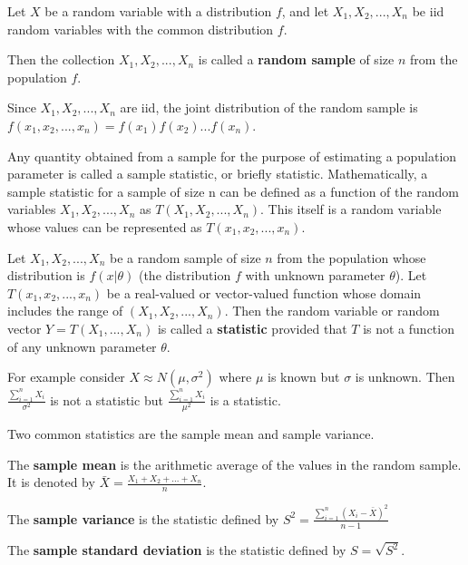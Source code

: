 \begin{defn}
Let $X$ be a random variable with a distribution $f$, and let $X_1, X_2, ..., X_n$ be iid random variables with the common distribution $f$.

Then the collection $X_1, X_2, ..., X_n$ is called a \textbf{random sample} of size $n$ from the population $f$.
\end{defn}

Since $X_1, X_2, ..., X_n$ are iid, the joint distribution of the random sample is $f(x_1, x_2, ..., x_n) = f(x_1) f(x_2) ... f(x_n)$.

Any quantity obtained from a sample for the purpose of estimating a population parameter is called a sample
statistic, or briefly statistic. Mathematically, a sample statistic for a sample of size n can be defined as a function of the random variables $X_1, X_2, ..., X_n$ as $T(X_1, X_2, ..., X_n)$. This itself is a random variable whose values can be represented as $T(x_1, x_2, ..., x_n)$.

\begin{defn}[Statistic]
    Let $X_1, X_2, ..., X_n$ be a random sample of size $n$ from the population whose distribution is $f\left (x|\theta\right )$ (the distribution $f$ with unknown parameter $\theta$). Let $T\left (x_1, x_2, ...,x_n\right )$ be a real-valued or vector-valued function whose domain includes the range of $\left (X_1, X_2, ..., X_n\right )$. Then the random variable or random vector $Y = T\left (X_1, ..., X_n\right )$ is called a \textbf{statistic} provided that $T$ is not a function of any unknown parameter $\theta$.
\end{defn}

For example consider $X \approx N(\mu, \sigma^2)$ where $\mu$ is known but $\sigma$ is unknown. Then $\frac{\sum_{i=1}^n X_i}{\sigma^2}$ is not a statistic but $\frac{\sum_{i=1}^n X_i}{\mu^2}$ is a statistic.

Two common statistics are the sample mean and sample variance.

\begin{defn}
    The \textbf{sample mean} is the arithmetic average of the values in the random sample. It is denoted by $\bar{X} = \displaystyle \frac{X_1 + X_2 + ... + X_n}{n}$.

    The \textbf{sample variance} is the statistic defined by $S^2 = \displaystyle \frac{\sum_{i=1}^n \left (X_i - \bar{X}\right )^2}{n-1}$

    The \textbf{sample standard deviation} is the statistic defined by $S = \sqrt{S^2}$.
\end{defn}

